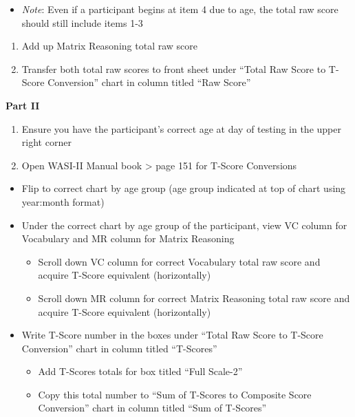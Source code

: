 \documentclass[]{book}
\providecommand{\tightlist}{%
  \setlength{\itemsep}{0pt}\setlength{\parskip}{0pt}}
\begin{document}
\begin{itemize}
\tightlist
\item
  \emph{Note}: Even if a participant begins at item 4 due to age, the
  total raw score should still include items 1-3
\end{itemize}

\begin{enumerate}
\def\labelenumi{\arabic{enumi}.}
\setcounter{enumi}{3}
\tightlist
\item
  Add up Matrix Reasoning total raw score
\item
  Transfer both total raw scores to front sheet under ``Total Raw Score
  to T-Score Conversion'' chart in column titled ``Raw Score''
\end{enumerate}

\textbf{Part II}

\begin{enumerate}
\def\labelenumi{\arabic{enumi}.}
\tightlist
\item
  Ensure you have the participant's correct age at day of testing in the
  upper right corner
\item
  Open WASI-II Manual book \textgreater{} page 151 for T-Score
  Conversions
\end{enumerate}

\begin{itemize}
\tightlist
\item
  Flip to correct chart by age group (age group indicated at top of
  chart using year:month format)
\item
  Under the correct chart by age group of the participant, view VC
  column for Vocabulary and MR column for Matrix Reasoning

  \begin{itemize}
  \tightlist
  \item
    Scroll down VC column for correct Vocabulary total raw score and
    acquire T-Score equivalent (horizontally)
  \item
    Scroll down MR column for correct Matrix Reasoning total raw score
    and acquire T-Score equivalent (horizontally)
  \end{itemize}
\item
  Write T-Score number in the boxes under ``Total Raw Score to T-Score
  Conversion'' chart in column titled ``T-Scores''

  \begin{itemize}
  \tightlist
  \item
    Add T-Scores totals for box titled ``Full Scale-2''
  \item
    Copy this total number to ``Sum of T-Scores to Composite Score
    Conversion'' chart in column titled ``Sum of T-Scores''
  \end{itemize}
\end{itemize}
\end{document}
